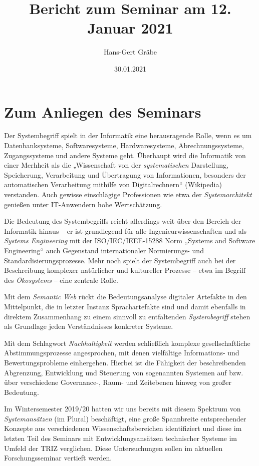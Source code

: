 \documentclass[a4paper,11pt]{article}
\author{Hans-Gert Gräbe}
\title{Bericht zum Seminar am 12. Januar 2021}
\date{30.01.2021}
\begin{document}
\maketitle

\section{Zum Anliegen des Seminars}

Der Systembegriff spielt in der Informatik eine herausragende Rolle, wenn es
um Datenbanksysteme, Softwaresysteme, Hardwaresysteme, Abrechnungssysteme,
Zugangssysteme und andere Systeme geht.  Überhaupt wird die Informatik von
einer Merhheit als die „Wissenschaft von der \emph{systematischen}
Darstellung, Speicherung, Verarbeitung und Übertragung von Informationen,
besonders der automatischen Verarbeitung mithilfe von Digitalrechnern“
(Wikipedia) verstanden.  Auch gewisse einschlägige Professionen wie etwa der
\emph{Systemarchitekt} genießen unter IT-Anwendern hohe Wertschätzung.

Die Bedeutung des Systembegriffs reicht allerdings weit über den Bereich der
Informatik hinaus -- er ist grundlegend für alle Ingenieurwissenschaften und
als \emph{Systems Engineering} mit der ISO/IEC/IEEE-15288 Norm „Systems and
Software Engineering“ auch Gegenstand internationaler Normierungs- und
Standardisierungsprozesse.  Mehr noch spielt der Systembegriff auch bei der
Beschreibung komplexer natürlicher und kultureller Prozesse -- etwa im Begriff
des \emph{Ökosystems} -- eine zentrale Rolle.

Mit dem \emph{Semantic Web} rückt die Bedeutungsanalyse digitaler Artefakte in
den Mittelpunkt, die in letzter Instanz Sprachartefakte sind und damit
ebenfalls in direktem Zusammenhang zu einem sinnvoll zu entfaltenden
\emph{Systembegriff} stehen als Grundlage jeden Verständnisses konkreter
Systeme.

Mit dem Schlagwort \emph{Nachhaltigkeit} werden schließlich komplexe
gesellschaftliche Abstimmungsprozesse angesprochen, mit denen vielfältige
Informations- und Bewertungsprobleme einhergehen. Hierbei ist die Fähigkeit
der beschreibenden Abgrenzung, Entwicklung und Steuerung von sogenannten
Systemen auf bzw. über verschiedene Governance-, Raum- und Zeitebenen hinweg
von großer Bedeutung.

Im Wintersemester 2019/20 hatten wir uns bereits mit diesem Spektrum von
\emph{Systemansätzen} (im Plural) beschäftigt, eine große Spannbreite
entsprechender Konzepte aus verschiedenen Wissenschaftsbereichen identifiziert
und diese im letzten Teil des Seminars mit Entwicklungsansätzen technischer
Systeme im Umfeld der TRIZ verglichen.  Diese Untersuchungen sollen im
aktuellen Forschungsseminar vertieft werden.
\end{document}
